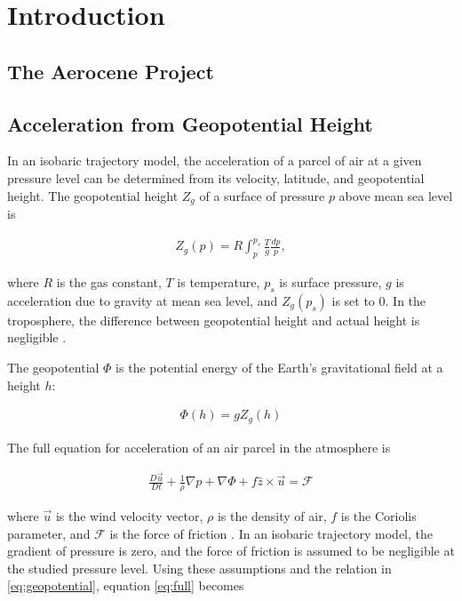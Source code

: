\chapter{Introduction}

\section{The Aerocene Project}

\section{Acceleration from Geopotential Height} \label{sec:acceleration}
In an isobaric trajectory model, the acceleration of a parcel of air at a given pressure level can be determined from its velocity, latitude, and geopotential height.
The geopotential height $Z_g$ of a surface of pressure $p$ above mean sea level is 

\begin{align}
    Z_g(p) = R \int_p^{p_s} \frac{T}{g} \frac{dp}{p},
\end{align}

where $R$ is the gas constant, $T$ is temperature, $p_s$ is surface pressure, $g$ is acceleration due to gravity at mean sea level, and $Z_g(p_s)$ is set to 0. 
In the troposphere, the difference between geopotential height and actual height is negligible \cite{marshall_atmosphere_2008}. 

The geopotential $\Phi$ is the potential energy of the Earth's gravitational field at a height $h$:

\begin{align}
    \Phi (h) = g Z_g (h) \label{eq:geopotential}
\end{align}

The full equation for acceleration of an air parcel in the atmosphere is

\begin{align}
    \frac{D \vec{u}}{Dt} + \frac{1}{\rho} \nabla p + \nabla \Phi + f \hat{z} \times \vec{u} = \mathcal{F} \label{eq:full}
\end{align}

where $\vec{u}$ is the wind velocity vector, $\rho$ is the density of air, $f$ is the Coriolis parameter, and $\mathcal{F}$ is the force of friction \cite{marshall_atmosphere_2008}. 
In an isobaric trajectory model, the gradient of pressure is zero, and the force of friction is assumed to be negligible at the studied pressure level.
Using these assumptions and the relation in \ref{eq:geopotential}, equation \ref{eq:full} becomes

